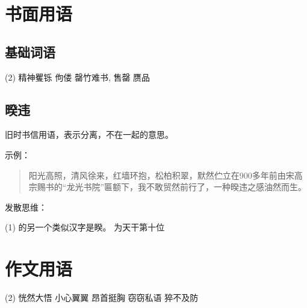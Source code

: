 \section{书面用语}

  \subsection{基础词语}

\begin{tasks}[style=enumerate](2)
    \task 精神矍铄  
    \task 佝偻      
    \task 罄竹难书, 售罄 
    \task 赝品      
\end{tasks}

  \subsection{暌违} 
旧时书信用语，表示分离，不在一起的意思。

示例：

\begin{quotation}
  阳光高照，清风徐来，红墙环抱，松柏积翠，默然伫立在900多年前由宋高宗赐书的“龙光书院”匾额下，我不敢贸然前行了，一种暌违之感油然而生。
\end{quotation}

发散思维： 

\begin{tasks}[style=itemize](1)
   \task {}的另一个类似汉字是睽。
   \task {}为天干第十位
\end{tasks}




\section{作文用语}

\begin{tasks}[style=enumerate](2)
    \task 恍然大悟  
    \task 小心翼翼      
    \task 昂首挺胸  
    \task 窃窃私语  
    \task 猝不及防   
\end{tasks}